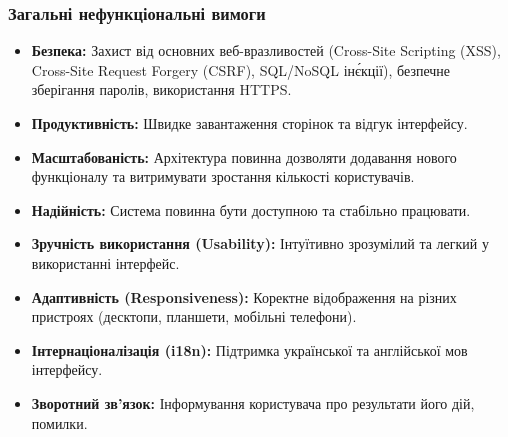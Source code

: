 \subsubsection{Загальні нефункціональні вимоги}
\begin{itemize}
    \item \textbf{Безпека:} Захист від основних веб-вразливостей (Cross-Site Scripting (XSS), Cross-Site Request Forgery (CSRF), SQL/NoSQL ін\'єкції), безпечне зберігання паролів, використання HTTPS.
    \item \textbf{Продуктивність:} Швидке завантаження сторінок та відгук інтерфейсу.
    \item \textbf{Масштабованість:} Архітектура повинна дозволяти додавання нового функціоналу та витримувати зростання кількості користувачів.
    \item \textbf{Надійність:} Система повинна бути доступною та стабільно працювати.
    \item \textbf{Зручність використання (Usability):} Інтуїтивно зрозумілий та легкий у використанні інтерфейс.
    \item \textbf{Адаптивність (Responsiveness):} Коректне відображення на різних пристроях (десктопи, планшети, мобільні телефони).
    \item \textbf{Інтернаціоналізація (i18n):} Підтримка української та англійської мов інтерфейсу.
    \item \textbf{Зворотний зв'язок:} Інформування користувача про результати його дій, помилки.
\end{itemize} 